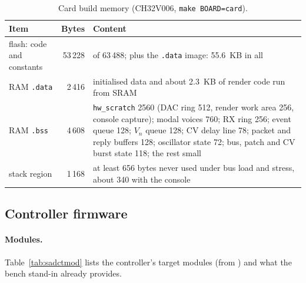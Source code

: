 \begin{table}[htbp]
\centering\small
\caption{Card build memory (CH32V006, \texttt{make BOARD=card}).}\label{tab:sadmem}
\begin{tabularx}{\textwidth}{@{}l r X@{}}
\toprule
Item & Bytes & Content \\
\midrule
flash: code and constants & 53\,228 & of 63\,488; plus the \texttt{.data} image: \SI{55.6}{KB} in all \\
RAM \texttt{.data} & 2\,416 & initialised data and about \SI{2.3}{KB} of render code run from SRAM \\
RAM \texttt{.bss} & 4\,608 & \texttt{hw\_scratch} 2560 (DAC ring 512, render work area 256, console capture);
  modal voices 760; RX ring 256; event queue 128; $V_n$ queue 128; CV delay line 78; packet and reply buffers 128;
  oscillator state 72; bus, patch and CV burst state 118; the rest small \\
stack region & 1\,168 & at least 656 bytes never used under bus load and stress, about 340 with the console \\
\bottomrule
\end{tabularx}
\end{table}

\subsection{Controller firmware}\label{sad:ctrl}

\paragraph{Modules.} Table~\ref{tab:sadctmod} lists the controller's target modules (from )
and what the bench stand-in already provides.

